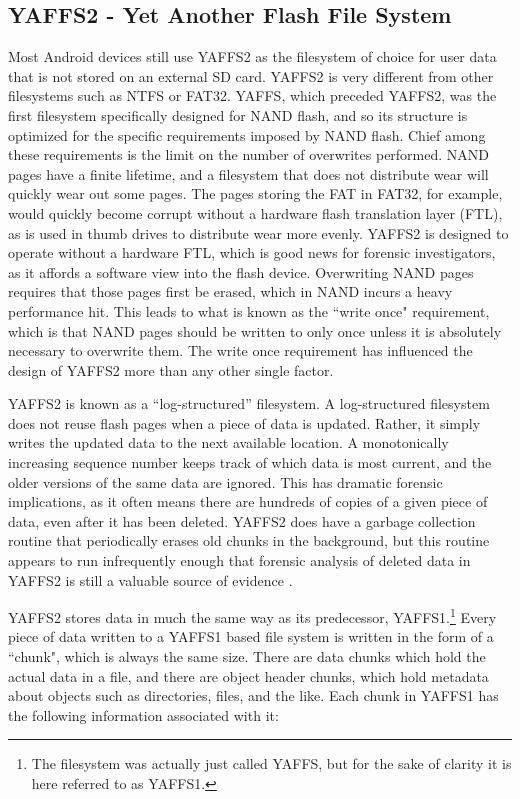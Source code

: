 \subsection{YAFFS2 - Yet Another Flash File System} Most Android devices still use YAFFS2 as the filesystem of choice for user data
that is not stored on an external SD card.  YAFFS2 is very different from other filesystems such as NTFS or FAT32.  YAFFS, which
preceded YAFFS2,  was the first filesystem specifically designed for NAND flash, and so its structure is optimized for the specific
requirements imposed by NAND flash.  Chief among these requirements is the limit on the number of overwrites performed.  NAND pages
have a finite lifetime, and a filesystem that does not distribute wear will quickly wear out some pages.  The pages storing the FAT
in FAT32, for example, would quickly become corrupt without a hardware flash translation layer (FTL), as is used in thumb drives to
distribute wear more evenly.  YAFFS2 is designed to operate without a hardware FTL, which is good news for forensic investigators,
as it affords a software view into the flash device.  Overwriting NAND pages requires that those pages first be erased, which in
NAND incurs a heavy performance hit.  This leads to what is known as the ``write once" requirement, which is that NAND pages should
be written to only once unless it is absolutely necessary to overwrite them. The write once requirement has influenced the design of
YAFFS2 more than any other single factor.

YAFFS2 is known as a ``log-structured'' filesystem.  A log-structured filesystem does not reuse flash pages when a piece of data is
updated.  Rather, it simply writes the updated data to the next available location.  A monotonically increasing sequence number
keeps track of which data is most current, and the older versions of the same data are ignored.  This has dramatic forensic
implications, as it often means there are hundreds of copies of a given piece of data, even after it has been deleted.  YAFFS2 does
have a garbage collection routine that periodically erases old chunks in the background, but this routine appears to run
infrequently enough that forensic analysis of deleted data in YAFFS2 is still a valuable source of evidence \cite{naval}. 

YAFFS2 stores data in much the same way as its predecessor, YAFFS1.\footnote{The filesystem was actually
just called YAFFS, but for the sake of clarity it is here referred to as YAFFS1.} Every piece of data written to a YAFFS1 based file
system is written in the form of a ``chunk", which is always the same size.  There are data chunks which hold the actual data in a
file, and there are object header chunks, which hold metadata about objects such as directories, files, and the like.  Each chunk in
YAFFS1 has the following information associated with it:


